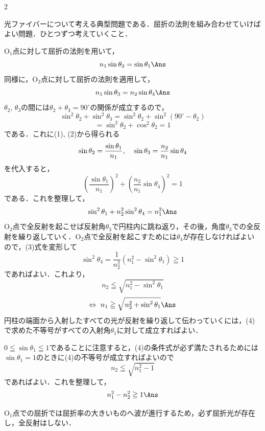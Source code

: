 \begin{multicols}{2}
\par\nopagebreak
\begin{sisin}
光ファイバーについて考える典型問題である．屈折の法則を組み合わせていけばよい問題．ひとつずつ考えていくこと．
\end{sisin}
\KaiHead
\begin{komon}
 $\mathrm{O_1}$点に対して屈折の法則を用いて，
       \[n_1\sin\theta_2=\sin\theta_1\Ans\]
 同様に，$\mathrm{O_2}$点に対して屈折の法則を適用して，
       \[n_1\sin\theta_3=n_2\sin\theta_4\Ans\]
 $\theta_2$, $\theta_3$の間には$\theta_2+\theta_3=90^\circ$の関係が成立するので，
       \[\sin^2\theta_2+\sin^2\theta_3=\sin^2\theta_2+\sin^2(90^\circ-\theta_2)\]
       \[=\sin^2\theta_2+\cos^2\theta_2=1\]
       である．これに(1), (2)から得られる
       \[\sin\theta_2=\frac{\sin\theta_1}{n_1},\hspace{4mm}\sin\theta_3=\frac{n_2}{n_1}\sin\theta_4\]
       を代入すると，
       \[\left(\frac{\sin\theta_1}{n_1}\right)^2+\left(\frac{n_2}{n_1}\sin\theta_4\right)^2=1\]
       である．これを整理して，
       \[\sin^2\theta_1+n_2^2\sin^2\theta_4=n_1^2\Ans\]
 $\mathrm{O_2}$点で全反射を起こせば反射角$\theta_3$で円柱内に跳ね返り，その後，角度$\theta_3$での全反射を繰り返していく．$\mathrm{O_2}$点で全反射を起こすためには$\theta_4$が存在しなければよいので，(3)式を変形して
       \[\sin^2\theta_4=\frac{1}{n_2^2}\left(n_1^2-\sin^2\theta_1\right)\geqq 1\]
       であればよい．これより，
       \[n_2\leqq\sqrt{n_1^2-\sin^2\theta_1}\]
       \[\Leftrightarrow\ n_1\geqq\sqrt{n_2^2+\sin^2\theta_1}\Ans\]
 円柱の端面から入射したすべての光が反射を繰り返して伝わっていくには，(4)で求めた不等号がすべての入射角$\theta_1$に対して成立すればよい．

       $0\leqq\sin\theta_1\leqq 1$であることに注意すると，(4)の条件式が必ず満たされるためには$\sin\theta_1=1$のときに(4)の不等号が成立すればよいので
       \[n_2\leqq\sqrt{n_1^2-1}\]
       であればよい．これを整理して，
       \[n_1^2-n_2^2\geqq 1\Ans\]
\end{komon}
\begin{chuu}
$\mathrm{O_1}$点での屈折では屈折率の大きいものへ波が進行するため，必ず屈折光が存在し，全反射はしない．
\end{chuu}



\end{multicols}
